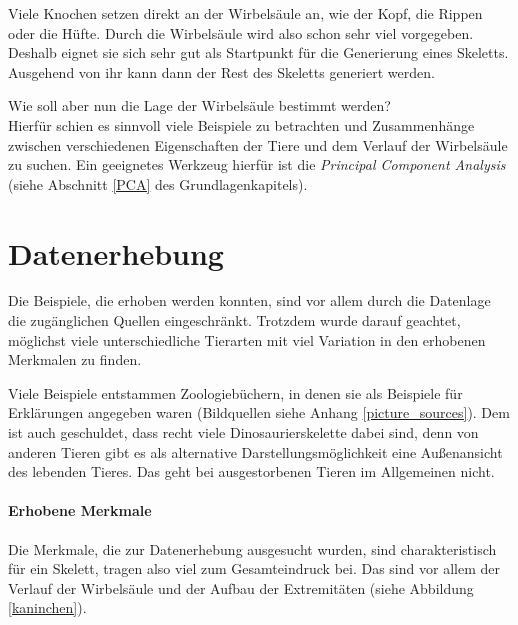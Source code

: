 Viele Knochen setzen direkt an der Wirbelsäule an, wie \zb der Kopf, die Rippen oder die Hüfte. Durch die Wirbelsäule wird also schon sehr viel vorgegeben.
Deshalb eignet sie sich sehr gut als Startpunkt für die Generierung eines Skeletts. Ausgehend von ihr kann dann der Rest des Skeletts generiert werden.

Wie soll aber nun die Lage der Wirbelsäule bestimmt werden?\\
Hierfür schien es sinnvoll viele Beispiele zu betrachten und Zusammenhänge zwischen verschiedenen Eigenschaften der Tiere und dem Verlauf der Wirbelsäule zu suchen.
Ein geeignetes Werkzeug hierfür ist die \emph{Principal Component Analysis} (siehe Abschnitt \ref{PCA} des Grundlagenkapitels).
 
 
 \section{Datenerhebung}
 \label{pca_input_data}
 
 Die Beispiele, die erhoben werden konnten, sind vor allem durch die Datenlage \bzw die zugänglichen Quellen eingeschränkt. Trotzdem wurde darauf geachtet, möglichst viele unterschiedliche Tierarten mit viel Variation in den erhobenen Merkmalen zu finden.
 
 Viele Beispiele entstammen Zoologiebüchern, in denen sie als Beispiele für Erklärungen angegeben waren (Bildquellen siehe Anhang \ref{picture_sources}). Dem ist auch geschuldet, dass recht viele Dinosaurierskelette dabei sind, denn von anderen Tieren gibt es als alternative Darstellungsmöglichkeit eine Außenansicht des lebenden Tieres. Das geht bei ausgestorbenen Tieren im Allgemeinen nicht.
 
 \paragraph{Erhobene Merkmale}
 Die Merkmale, die zur Datenerhebung ausgesucht wurden, sind charakteristisch für ein Skelett, tragen also viel zum Gesamteindruck bei. Das sind vor allem der Verlauf der Wirbelsäule und der Aufbau der Extremitäten (siehe Abbildung \ref{kaninchen}).
 
